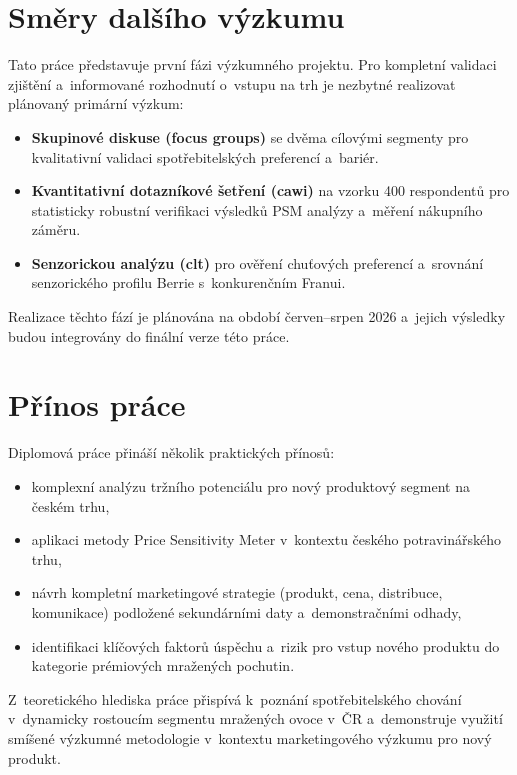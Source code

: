 \section{Směry dalšího výzkumu}

Tato práce představuje první fázi výzkumného projektu. Pro kompletní validaci zjištění a~informované rozhodnutí o~vstupu na trh je nezbytné realizovat plánovaný primární výzkum:

\begin{itemize}
  \item \textbf{Skupinové diskuse (focus groups)} se dvěma cílovými segmenty pro kvalitativní validaci spotřebitelských preferencí a~bariér.
  \item \textbf{Kvantitativní dotazníkové šetření (\gls{cawi})} na vzorku 400 respondentů pro statisticky robustní verifikaci výsledků PSM analýzy a~měření nákupního záměru.
  \item \textbf{Senzorickou analýzu (\gls{clt})} pro ověření chuťových preferencí a~srovnání senzorického profilu Berrie s~konkurenčním Franui.
\end{itemize}

Realizace těchto fází je plánována na období červen--srpen 2026 a~jejich výsledky budou integrovány do finální verze této práce.

\section{Přínos práce}

Diplomová práce přináší několik praktických přínosů:
\begin{itemize}
  \item komplexní analýzu tržního potenciálu pro nový produktový segment na českém trhu,
  \item aplikaci metody Price Sensitivity Meter v~kontextu českého potravinářského trhu,
  \item návrh kompletní marketingové strategie (produkt, cena, distribuce, komunikace) podložené sekundárními daty a~demonstračními odhady,
  \item identifikaci klíčových faktorů úspěchu a~rizik pro vstup nového produktu do kategorie prémiových mražených pochutin.
\end{itemize}

Z~teoretického hlediska práce přispívá k~poznání spotřebitelského chování v~dynamicky rostoucím segmentu mražených ovoce v~ČR a~demonstruje využití smíšené výzkumné metodologie v~kontextu marketingového výzkumu pro nový produkt.
